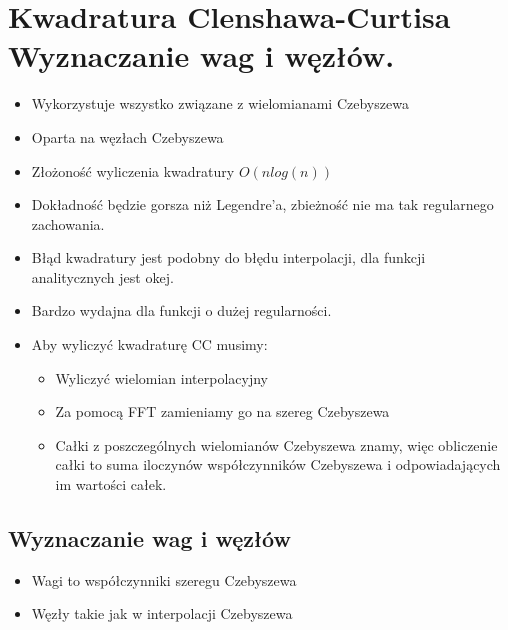 \documentclass[a4paper]{article}
\begin{document}
\section{Kwadratura Clenshawa-Curtisa Wyznaczanie wag i węzłów.}
\begin{itemize}
    \item Wykorzystuje wszystko związane z wielomianami Czebyszewa
    \item Oparta na węzłach Czebyszewa
    \item Złożoność wyliczenia kwadratury $O(n log(n))$
    \item Dokładność będzie gorsza niż Legendre'a, zbieżność nie ma tak regularnego zachowania.
    \item Błąd kwadratury jest podobny do błędu interpolacji, dla funkcji analitycznych jest okej.
    \item Bardzo wydajna dla funkcji o dużej regularności.
    \item Aby wyliczyć kwadraturę CC musimy:
    \begin{itemize}
        \item Wyliczyć wielomian interpolacyjny
        \item Za pomocą FFT zamieniamy go na szereg Czebyszewa
        \item Całki z poszczególnych wielomianów Czebyszewa znamy, więc obliczenie całki to suma iloczynów współczynników Czebyszewa i odpowiadających im wartości całek.
    \end{itemize}
\end{itemize}

\subsection{Wyznaczanie wag i węzłów}
\begin{itemize}
    \item Wagi to współczynniki szeregu Czebyszewa
    \item Węzły takie jak w interpolacji Czebyszewa
\end{itemize}
\end{document}
